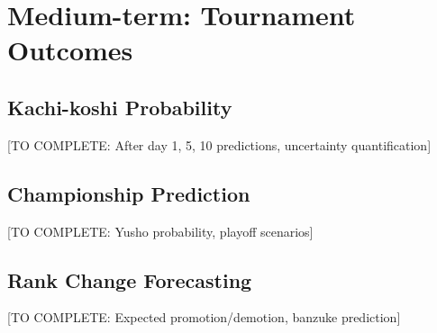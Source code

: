 \section{Medium-term: Tournament Outcomes}

\subsection{Kachi-koshi Probability}

[TO COMPLETE: After day 1, 5, 10 predictions, uncertainty quantification]

\subsection{Championship Prediction}

[TO COMPLETE: Yusho probability, playoff scenarios]

\subsection{Rank Change Forecasting}

[TO COMPLETE: Expected promotion/demotion, banzuke prediction]
